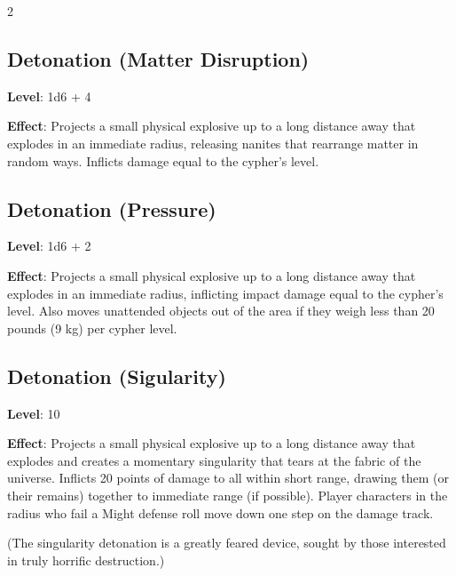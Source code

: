 \begin{multicols}{2}

\subsection{Detonation (Matter Disruption)}

\textbf{Level}: 1d6 + 4

\textbf{Effect}:  Projects a small physical explosive up to a long distance away that explodes in an immediate radius, releasing nanites that rearrange matter in random ways. Inflicts damage equal to the cypher’s level.

\subsection{Detonation (Pressure)}

\textbf{Level}: 1d6 + 2

\textbf{Effect}: Projects a small physical explosive up to a long distance away that explodes in an immediate radius, inflicting impact damage equal to the cypher’s level. Also moves unattended objects out of the area if they weigh less than 20 pounds (9 kg) per cypher level.

\subsection{Detonation (Sigularity)}

\textbf{Level}: 10

\textbf{Effect}: Projects a small physical explosive up to a long distance away that explodes and creates a momentary singularity that tears at the fabric of the universe. Inflicts 20 points of damage to all within short range, drawing them (or their remains) together to immediate range (if possible). Player characters in the radius who fail a Might defense roll move down one step on the damage track.

(The singularity detonation is a greatly feared device, sought by those interested in truly horrific destruction.)


\end{multicols}
